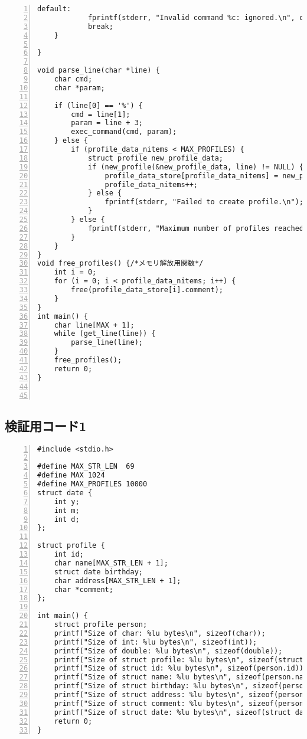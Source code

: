 \begin{Verbatim}[numbers=left, xleftmargin=10mm, numbersep=6pt,
                    fontsize=\small, baselinestretch=0.8]
        default:
            fprintf(stderr, "Invalid command %c: ignored.\n", cmd);
            break;
    }

}

void parse_line(char *line) {
    char cmd;
    char *param;

    if (line[0] == '%') {
        cmd = line[1];
        param = line + 3;
        exec_command(cmd, param);
    } else {
        if (profile_data_nitems < MAX_PROFILES) {
            struct profile new_profile_data;
            if (new_profile(&new_profile_data, line) != NULL) {
                profile_data_store[profile_data_nitems] = new_profile_data;
                profile_data_nitems++;
            } else {
                fprintf(stderr, "Failed to create profile.\n");
            }
        } else {
            fprintf(stderr, "Maximum number of profiles reached.\n");
        }
    }
}
void free_profiles() {/*メモリ解放用関数*/
    int i = 0;
    for (i = 0; i < profile_data_nitems; i++) {
        free(profile_data_store[i].comment);
    }
}
int main() {
    char line[MAX + 1];
    while (get_line(line)) {
        parse_line(line);
    }
    free_profiles();
    return 0;
}
                   
                    
\end{Verbatim}
\subsection{検証用コード1}\label{code1}
\begin{Verbatim}[numbers=left, xleftmargin=10mm, numbersep=6pt,
  fontsize=\small, baselinestretch=0.8]
  #include <stdio.h>

#define MAX_STR_LEN  69
#define MAX 1024
#define MAX_PROFILES 10000
struct date {
    int y;
    int m;
    int d;
};

struct profile {
    int id;
    char name[MAX_STR_LEN + 1];
    struct date birthday;
    char address[MAX_STR_LEN + 1];
    char *comment;
};

int main() {
    struct profile person;
    printf("Size of char: %lu bytes\n", sizeof(char));
    printf("Size of int: %lu bytes\n", sizeof(int));
    printf("Size of double: %lu bytes\n", sizeof(double));
    printf("Size of struct profile: %lu bytes\n", sizeof(struct profile));
    printf("Size of struct id: %lu bytes\n", sizeof(person.id));
    printf("Size of struct name: %lu bytes\n", sizeof(person.name));
    printf("Size of struct birthday: %lu bytes\n", sizeof(person.birthday));
    printf("Size of struct address: %lu bytes\n", sizeof(person.address));
    printf("Size of struct comment: %lu bytes\n", sizeof(person.comment));
    printf("Size of struct date: %lu bytes\n", sizeof(struct date));
    return 0;
}
\end{Verbatim}
